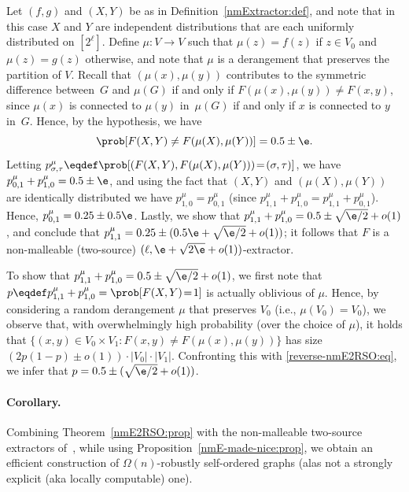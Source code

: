 %
%
%
%
%
%
%
%
%
%
%
%
%
%
%
%
%
%
%

\BPF
Let $(f,g)$ and $(X,Y)$ be as in Definition~\ref{nmExtractor:def},
and note that in this case $X$ and $Y$ are independent distributions
that are each uniformly distributed on $[2^\ell]$.
%
%
%
Define $\mu:V\to V$ such that $\mu(z)=f(z)$ if $z\in V_0$
and $\mu(z)=g(z)$ otherwise, and note that $\mu$ is a derangement
that preserves the partition of $V$.
Recall that $(\mu(x),\mu(y))$ contributes to the symmetric difference
between~$G$ and $\mu(G)$ if and only if $F(\mu(x),\mu(y))\neq F(x,y)$,
since $\mu(x)$ is connected to $\mu(y)$ in~$\mu(G)$
if and only if $x$ is connected to $y$ in~$G$.
Hence, by the hypothesis, we have
\begin{equation}\label{reverse-nmE2RSO:eq}
\prob[F(X,Y)\neq F(\mu(X),\mu(Y))]=0.5\pm\e.
\end{equation}
Letting
$p_{\sigma,\tau}^\mu\eqdef\prob[(F(X,Y),F(\mu(X),\mu(Y)))\!=\!(\sigma,\tau)]$,
we have $p_{0,1}^\mu+p_{1,0}^\mu=0.5\pm\e$,
and using the fact that $(X,Y)$ and $(\mu(X),\mu(Y))$
are identically distributed we have $p_{1,0}^\mu=p_{0,1}^\mu$
(since $p_{1,1}^\mu+p_{1,0}^\mu=p_{1,1}^\mu+p_{0,1}^\mu$).
Hence, $p_{0,1}^\mu=0.25\pm0.5\e$.
Lastly, we show that $p_{1,1}^\mu+p_{1,0}^\mu=0.5\pm{\sqrt{\e/2}}+o(1)$,
and conclude that $p_{1,1}^\mu=0.25\pm(0.5\e+{\sqrt{\e/2}}+o(1))$;
it follows that $F$ is
a non-malleable (two-source) $(\ell,\e+{\sqrt{2\e}}+o(1))$-extractor.
%

To show that $p_{1,1}^\mu+p_{1,0}^\mu=0.5\pm{\sqrt{\e/2}}+o(1)$,
we first note that $p\eqdef p_{1,1}^\mu+p_{1,0}^\mu=\prob[F(X,Y)\!=\!1]$
is actually oblivious of $\mu$.
%
Hence, by considering a random derangement $\mu$ that preserves $V_0$
(i.e., $\mu(V_0)=V_0$), we observe that,
with overwhelmingly high probability (over the choice of $\mu$),
it holds that $\{(x,y)\!\in\!V_0\times V_1\!:\!F(x,y)\neq F(\mu(x),\mu(y))\}$
has size $(2p(1-p)\pm o(1))\cdot|V_0|\cdot|V_1|$.
%
%
%
%
%
Confronting this with \eqref{reverse-nmE2RSO:eq},
we infer that $p=0.5\pm({\sqrt{\e/2}}+o(1))$.
%
%
\EPF


\paragraph{Corollary.}
Combining Theorem~\ref{nmE2RSO:prop}
with the non-malleable two-source extractors of~\cite[Thm.~1]{CGL},
while using Proposition~\ref{nmE-made-nice:prop},
we obtain an efficient construction
of $\Omega(n)$-robustly self-ordered graphs
(alas not a strongly explicit (aka locally computable) one).

